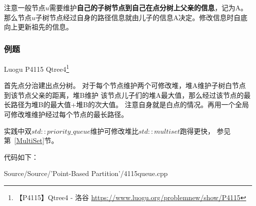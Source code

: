 注意一般节点$u$需要维护{\bfseries 自己的子树节点到自己在点分树上父亲的信息}，记为A。
那么节点$u$子树节点经过自身的路径信息就由儿子的信息A决定。修改信息时自底向上更新祖先的信息。

\subsubsection{例题}

Luogu P4115 Qtree4\footnote{【P4115】Qtree4 - 洛谷
\url{https://www.luogu.org/problemnew/show/P4115}}

首先点分治建出点分树。
对于每个节点维护两个可修改堆，堆A维护子树白节点到该节点父亲的距离，堆B维护
该节点儿子们的堆A最大值，那么经过该节点的最长路径为堆B的最大值+堆B的次大值。
注意自身就是白点的情况。再用一个全局可修改堆维护经过每个节点的最长路径。

实践中双$std::priority\_queue$维护可修改堆比$std::multiset$跑得更快，
参见第~\ref{MultiSet}节。

代码如下：

{Source/Source/'Point-Based Partition'/4115queue.cpp}
